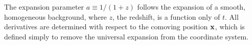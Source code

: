 %
The expansion parameter $a \equiv 1/(1 + z)$ follows the expansion of a smooth, homogeneous background, where $z$, the redshift, is a function only of $t$.  All derivatives are determined with respect to the comoving position $\mathbf{x}$, which is defined simply to remove the universal expansion from the coordinate system.

